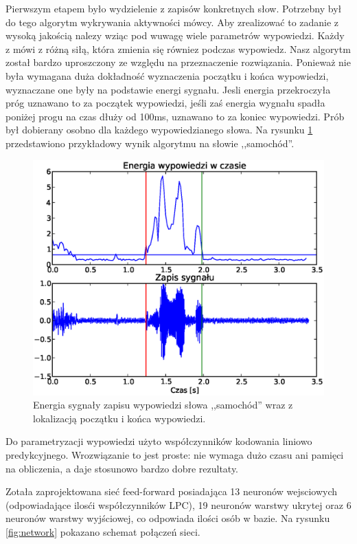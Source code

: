 \documentclass[a4paper]{article}
\begin{document}
Pierwszym etapem było wydzielenie z zapisów konkretnych słow. Potrzebny był do
tego algorytm wykrywania aktywności mówcy. Aby zrealizować to zadanie z wysoką
jakością nalezy wziąc pod wuwagę wiele parametrów wypowiedzi. Każdy z mówi z
różną siłą, która zmienia się równiez podczas wypowiedz. Nasz algorytm został
bardzo uproszczony ze względu na przeznaczenie rozwiązania. Ponieważ nie była
wymagana duża dokładność wyznaczenia początku i końca wypowiedzi, wyznaczane
one były na podstawie energi sygnału. Jesli energia przekroczyła próg uznawano
to za początek wypowiedzi, jeśli zaś energia wygnału spadła poniżej progu na
czas dłuży od 100ms, uznawano to za koniec wypowiedzi. Prób był dobierany
osobno dla każdego wypowiedzianego słowa. Na rysunku \ref{fig:say}
przedstawiono przykładowy wynik algorytmu na słowie ,,samochód''.

\begin{figure}[h!]
    \includegraphics[width=\textwidth]{say_samochod}
    \caption{Energia sygnały zapisu wypowiedzi słowa ,,samochód'' wraz z
    lokalizacją początku i końca wypowiedzi.}
    \label{fig:say}
\end{figure}

Do parametryzacji wypowiedzi użyto współczynników kodowania liniowo predykcyjnego.
Wrozwiązanie to jest proste: nie wymaga dużo czasu ani pamięci na obliczenia, a
daje stosunowo bardzo dobre rezultaty.

Zotała zaprojektowana sieć feed-forward posiadająca 13 neuronów wejsciowych
(odpowiadające ilosći współczynników LPC), 19 neuronów warstwy ukrytej oraz 6
neuronów warstwy wyjściowej, co odpowiada ilości osób w bazie. Na rysunku
\ref{fig:network} pokazano schemat połączeń sieci.
\end{document}
